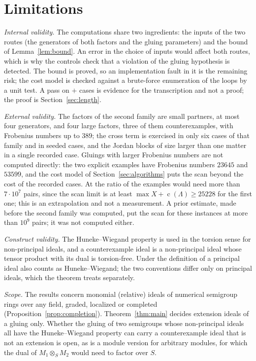 \documentclass[11pt]{article}
\theoremstyle{definition}
\theoremstyle{remark}
\newcommand{\cond}{\operatorname{c}}
\begin{document}
\section{Limitations}\label{sec:limitations}

\emph{Internal validity.} The computations share two ingredients: the inputs of the two routes (the generators of both factors and the gluing parameters) and the bound of Lemma~\ref{lem:bound}. An error in the choice of inputs would
affect both routes, which is why the controls check that a violation of the gluing hypothesis is detected. The bound is proved, so an implementation fault in it is the remaining risk; the cost model is checked against a brute-force enumeration of the
loops by a unit test. A pass on \NSeeded{}$+$\NHard{} cases is evidence for the transcription and not a proof; the proof is Section~\ref{sec:length}.

\emph{External validity.} The factors of the second family are small partners, at most four generators, and four large factors, three of them counterexamples, with Frobenius numbers up to $389$; the cross term is exercised in only
six cases of that family and in \NSeededCross{} seeded cases, and the Jordan blocks of size larger than one matter in a single recorded case. Gluings with larger Frobenius numbers are not computed directly: the two explicit examples have
Frobenius numbers $23645$ and $53599$, and the cost model of Section~\ref{sec:algorithms} puts the scan beyond the cost of the recorded cases. At the ratio of \HardRatioMin{} the examples would need more than $7\cdot10^{7}$ pairs, since
the scan limit is at least $\max X+\cond(\Lambda)\ge25228$ for the first one; this is an extrapolation and not a measurement. A prior estimate, made before the second family was computed, put the scan for these instances at more than $10^{9}$ pairs; it was not computed either.

\emph{Construct validity.} The Huneke--Wiegand property is used in the torsion sense for non-principal ideals, and a counterexample ideal is a non-principal ideal whose tensor product with its dual is torsion-free. Under the definition
of \cite{GarciaSanchezLeamer2013} a principal ideal also counts as Huneke--Wiegand; the two conventions differ only on principal ideals, which the theorem treats separately.

\emph{Scope.} The results concern monomial (relative) ideals of numerical semigroup rings over any field, graded, localized or completed (Proposition~\ref{prop:completion}). Theorem~\ref{thm:main} decides extension ideals of a gluing only. Whether the gluing of two
semigroups whose non-principal ideals all have the Huneke--Wiegand property can carry a counterexample ideal that is not an extension is open, as is a module version for arbitrary modules, for which the dual of $M_1\otimes_SM_2$ would need to factor over $S$.
\end{document}
